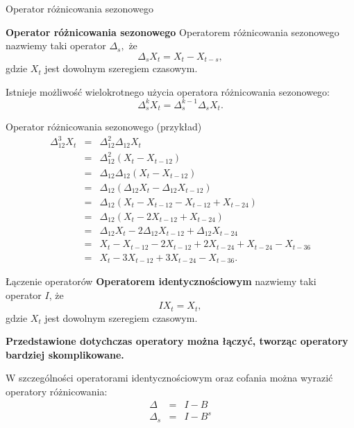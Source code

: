 \documentclass[a4paper, 11pt]{beamer}
\begin{document}
	\begin{frame}{Operator różnicowania sezonowego}
		\begin{block}{\textbf{Operator różnicowania sezonowego}}
			Operatorem różnicowania sezonowego nazwiemy taki operator $\Delta_{s},$ że \[
				\Delta_{s} X_{t} = X_{t} - X_{t-s},
			\] gdzie $X_{t}$ jest dowolnym szeregiem czasowym.
		\end{block}
		Istnieje możliwość wielokrotnego użycia operatora różnicowania sezonowego: \[
			\Delta^{k}_{s} X_{t} = \Delta^{k-1}_{s} \Delta_{s} X_{t}.
		\]
	\end{frame}
	
	\begin{frame}{Operator różnicowania sezonowego (przykład)}
		\begin{eqnarray*}
			\Delta^{3}_{12} X_{t} & = & \Delta^{2}_{12} \Delta_{12} X_{t}\\
				 & = & \Delta^{2}_{12} \left( X_{t} - X_{t-12} \right)\\
				 & = & \Delta_{12} \Delta_{12} \left( X_{t} - X_{t-12} \right)\\
				 & = & \Delta_{12} \left( \Delta_{12} X_{t} - \Delta_{12} X_{t-12} \right)\\
				 & = & \Delta_{12} \left( X_{t} - X_{t-12} - X_{t-12} + X_{t-24} \right)\\
				 & = & \Delta_{12} \left( X_{t} - 2 X_{t-12} + X_{t-24} \right)\\
				 & = & \Delta_{12} X_{t} - 2 \Delta_{12} X_{t-12} + \Delta_{12} X_{t-24}\\
				 & = & X_{t} - X_{t-12} - 2 X_{t-12} + 2 X_{t-24} + X_{t-24} - X_{t-36}\\
				 & = & X_{t} - 3 X_{t-12} + 3 X_{t-24} - X_{t-36}.
		\end{eqnarray*}
	\end{frame}
	
	\begin{frame}{Łączenie operatorów}
		\textbf{Operatorem identycznościowym} nazwiemy taki operator $I$, że \[
			I X_{t} = X_{t},
		\] gdzie $X_{t}$ jest dowolnym szeregiem czasowym.

		\begin{center}
			\textbf{Przedstawione dotychczas operatory można łączyć, tworząc operatory bardziej skomplikowane.}
		\end{center}

		W szczególności operatorami identycznościowym oraz cofania można wyrazić operatory różnicowania: \begin{eqnarray*}
			\Delta & = & I - B\\
			\Delta_{s} & = & I - B^{s}
		\end{eqnarray*}
	\end{frame}
	
\end{document}
